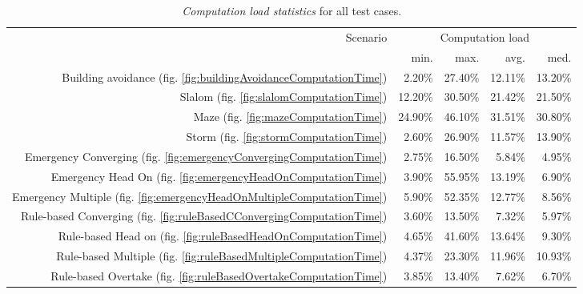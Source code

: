 \begin{table}[H]
    \centering
    \begin{tabular}{r||r|r|r|r}
    
    \multirow{2}{*}{Scenario} & \multicolumn{4}{c}{Computation load} \\ \cline{2-5} 
    & min. & max. & avg. & med. \\ \hline\hline
    Building avoidance (fig. \ref{fig:buildingAvoidanceComputationTime})		
                            &   2.20\% &  27.40\% &  12.11\%  & 13.20\% \\\hline
    Slalom (fig. \ref{fig:slalomComputationTime})				    
                            &  12.20\% &  30.50\% &  21.42\%  & 21.50\% \\\hline
    Maze (fig. \ref{fig:mazeComputationTime})					
                            &  24.90\% &  46.10\% &  31.51\%  & 30.80\% \\\hline
    Storm (fig. \ref{fig:stormComputationTime})					
                            &   2.60\% &  26.90\% &  11.57\%  & 13.90\% \\\hline\hline
    
    Emergency Converging (fig. \ref{fig:emergencyConvergingComputationTime})    
                            &   2.75\% &  16.50\% &   5.84\%  &  4.95\% \\\hline
    Emergency Head On (fig. \ref{fig:emergencyHeadOnComputationTime})	 	
                            &	3.90\% &  55.95\% &  13.19\%  &  6.90\% \\\hline
    Emergency Multiple (fig. \ref{fig:emergencyHeadOnMultipleComputationTime})	 	
                            &	5.90\% &  52.35\% &  12.77\%  &  8.56\% \\\hline\hline
    
    Rule-based Converging (fig. \ref{fig:ruleBasedCConvergingComputationTime})	
                            &   3.60\% &  13.50\% &   7.32\%  &  5.97\% \\\hline
    Rule-based Head on (fig. \ref{fig:ruleBasedHeadOnComputationTime})		
                            &   4.65\% &  41.60\% &  13.64\%  &  9.30\% \\\hline
    Rule-based Multiple	(fig. \ref{fig:ruleBasedMultipleComputationTime})	
                            &   4.37\% &  23.30\% &  11.96\%  & 10.93\% \\\hline
    Rule-based Overtake	(fig. \ref{fig:ruleBasedOvertakeComputationTime})	
                            &   3.85\% &  13.40\% &   7.62\%  &  6.70\% 
    
    \end{tabular}
    \caption{\emph{Computation load statistics} for all test cases.}
    \label{tab:computationLoadStatistics}
\end{table}

